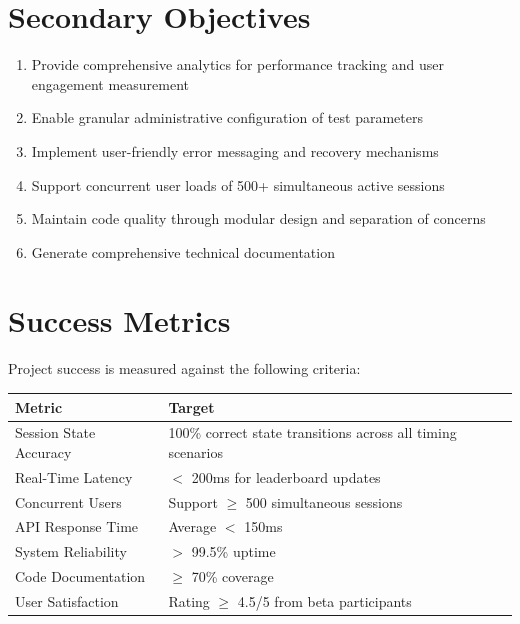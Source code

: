 \documentclass[12pt,a4paper]{report}
\newenvironment{reqbox}{%
  \begin{tcolorbox}[colback=lightgray,colframe=rulecol,
    leftrule=3pt,rightrule=0.4pt,toprule=0.4pt,bottomrule=0.4pt,
    arc=2pt,boxsep=2pt,left=4pt,right=4pt,top=3pt,bottom=3pt,breakable]
}{\end{tcolorbox}}
\begin{document}
\section{Secondary Objectives}

\begin{enumerate}[left=0pt,start=7]
  \item Provide comprehensive analytics for performance tracking and user engagement measurement
  \item Enable granular administrative configuration of test parameters
  \item Implement user-friendly error messaging and recovery mechanisms
  \item Support concurrent user loads of 500+ simultaneous active sessions
  \item Maintain code quality through modular design and separation of concerns
  \item Generate comprehensive technical documentation
\end{enumerate}

\section{Success Metrics}

Project success is measured against the following criteria:

\begin{reqbox}
  \begin{tabular}{l|p{7.5cm}}
    \textbf{Metric} & \textbf{Target} \\
    \hline
    Session State Accuracy & 100\% correct state transitions across all timing scenarios \\
    \hline
    Real-Time Latency & $<$ 200ms for leaderboard updates \\
    \hline
    Concurrent Users & Support $\geq$ 500 simultaneous sessions \\
    \hline
    API Response Time & Average $<$ 150ms \\
    \hline
    System Reliability & $>$ 99.5\% uptime \\
    \hline
    Code Documentation & $\geq$ 70\% coverage\\
    \hline
    User Satisfaction & Rating $\geq$ 4.5/5 from beta participants \\
    \hline
  \end{tabular}
\end{reqbox}

\cleardoublepage
\end{document}
